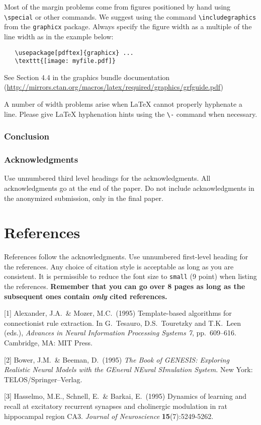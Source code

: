 \documentclass{article}
\begin{document}
Most of the margin problems come from figures positioned by hand using
\verb+\special+ or other commands. We suggest using the command
\verb+\includegraphics+ from the \verb+graphicx+ package. Always
specify the figure width as a multiple of the line width as in the
example below:
\begin{verbatim}
   \usepackage[pdftex]{graphicx} ...
   \texttt{[image: myfile.pdf]}
\end{verbatim}
See Section 4.4 in the graphics bundle documentation
(\url{http://mirrors.ctan.org/macros/latex/required/graphics/grfguide.pdf})

A number of width problems arise when \LaTeX{} cannot properly
hyphenate a line. Please give LaTeX hyphenation hints using the
\verb+\-+ command when necessary.

\subsubsection*{Conclusion}

\subsubsection*{Acknowledgments}

Use unnumbered third level headings for the acknowledgments. All
acknowledgments go at the end of the paper. Do not include
acknowledgments in the anonymized submission, only in the final paper.

\section*{References}

References follow the acknowledgments. Use unnumbered first-level
heading for the references. Any choice of citation style is acceptable
as long as you are consistent. It is permissible to reduce the font
size to \verb+small+ (9 point) when listing the references. {\bf
  Remember that you can go over 8 pages as long as the subsequent ones contain
  \emph{only} cited references.}
\medskip

\small

[1] Alexander, J.A.\ \& Mozer, M.C.\ (1995) Template-based algorithms
for connectionist rule extraction. In G.\ Tesauro, D.S.\ Touretzky and
T.K.\ Leen (eds.), {\it Advances in Neural Information Processing
  Systems 7}, pp.\ 609--616. Cambridge, MA: MIT Press.

[2] Bower, J.M.\ \& Beeman, D.\ (1995) {\it The Book of GENESIS:
  Exploring Realistic Neural Models with the GEneral NEural SImulation
  System.}  New York: TELOS/Springer--Verlag.

[3] Hasselmo, M.E., Schnell, E.\ \& Barkai, E.\ (1995) Dynamics of
learning and recall at excitatory recurrent synapses and cholinergic
modulation in rat hippocampal region CA3. {\it Journal of
  Neuroscience} {\bf 15}(7):5249-5262.
\end{document}
